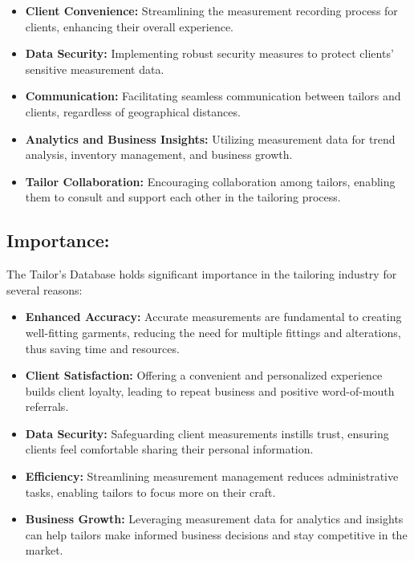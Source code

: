 \documentclass[12pt, letter paper]{report}
\begin{document}
{\begin{spacing}{1.5}
\begin{itemize}
\item\textbf{Client Convenience:} Streamlining the measurement recording process for clients, enhancing their overall experience.

\item\textbf{Data Security:} Implementing robust security measures to protect clients' sensitive measurement data.

\item\textbf{Communication:} Facilitating seamless communication between tailors and clients, regardless of geographical distances.

\item\textbf{Analytics and Business Insights:} Utilizing measurement data for trend analysis, inventory management, and business growth.

\item\textbf{Tailor Collaboration:} Encouraging collaboration among tailors, enabling them to consult and support each other in the tailoring process.

\end{itemize}

\subsection{Importance:}
The Tailor's Database holds significant importance in the tailoring industry for several reasons:
\begin{itemize}
\item\textbf{Enhanced Accuracy:} Accurate measurements are fundamental to creating well-fitting garments, reducing the need for multiple fittings and alterations, thus saving time and resources.

\item\textbf{Client Satisfaction:} Offering a convenient and personalized experience builds client loyalty, leading to repeat business and positive word-of-mouth referrals.

\item\textbf{Data Security: }Safeguarding client measurements instills trust, ensuring clients feel comfortable sharing their personal information.

\item\textbf{Efficiency:} Streamlining measurement management reduces administrative tasks, enabling tailors to focus more on their craft.

\item\textbf{Business Growth:} Leveraging measurement data for analytics and insights can help tailors make informed business decisions and stay competitive in the market.


\end{itemize}
\end{spacing}}
\end{document}
